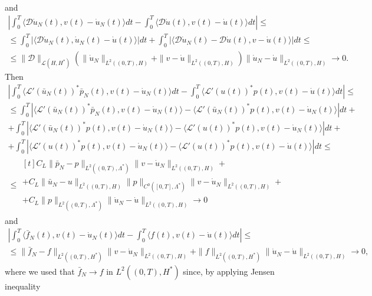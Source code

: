 \documentclass[a4paper,10pt,twoside]{amsbook}
\numberwithin{section}{chapter}
\numberwithin{equation}{chapter}
\theoremstyle{definition}
\begin{document}
and
\[
\begin{multlined}
\left|\int_0^T\langle \mathcal{D}\dot{u}_N(t),v(t)-\dot{u}_N(t)\rangle dt-\int_0^T\langle\mathcal{D}\dot{u}(t),v(t)-\dot{u}(t)\rangle dt\right|\le\\
\le\int_0^T\left|\langle\mathcal{D}\dot{u}_N(t),\dot{u}_N(t)-\dot{u}(t)\rangle\right|dt+\int_0^T\left|\langle\mathcal{D}\dot{u}_N(t)-\mathcal{D}\dot{u}(t),v-\dot{u}(t)\rangle\right|dt\le\\
\le\|\mathcal{D}\|_{\mathscr{L}(H,H^*)}\left(\|\dot{u}_N\|_{L^2((0,T),H)}+\|v-\dot{u}\|_{L^2((0,T),H)}\right)\|\dot{u}_N-\dot{u}\|_{L^2((0,T),H)}\to0.
\end{multlined}
\]
Then
\[
\begin{multlined}
\left|\int_0^T\langle\mathcal{L}'(\bar{u}_N(t))^*\bar{p}_N(t),v(t)-\dot{u}_N(t)\rangle dt-\int_0^T\langle\mathcal{L}'(u(t))^*p(t),v(t)-\dot{u}(t)\rangle dt\right|\le\\
\le\int_0^T\left|\langle\mathcal{L}'(\bar{u}_N(t))^*\bar{p}_N(t),v(t)-\dot{u}_N(t)\rangle-\langle\mathcal{L}'(\bar{u}_N(t))^*p(t),v(t)-\dot{u}_N(t)\rangle\right|dt+\\
+\int_0^T\left|\langle\mathcal{L}'(\bar{u}_N(t))^*p(t),v(t)-\dot{u}_N(t)\rangle-\langle\mathcal{L}'(u(t))^*p(t),v(t)-\dot{u}_N(t)\rangle\right|dt+\\
+\int_0^T\left|\langle\mathcal{L}'(u(t))^*p(t),v(t)-\dot{u}_N(t)\rangle-\langle\mathcal{L}'(u(t))^*p(t),v(t)-\dot{u}(t)\rangle\right|dt\le\\
\le
\begin{multlined}[t]
C_L\|\bar{p}_N-p\|_{L^2((0,T),\Lambda^*)}\|v-\dot{u}_N\|_{L^2((0,T),H)}+\\
+C_L\|\bar{u}_N-u\|_{L^2((0,T),H)}\|p\|_{C^0([0,T],\Lambda^*)}\|v-\dot{u}_N\|_{L^2((0,T),H)}+\\
+C_L\|p\|_{L^2((0,T),\Lambda^*)}\|\dot{u}_N-\dot{u}\|_{L^2((0,T),H)}\to0
\end{multlined}
\end{multlined}
\]
and
\[
\begin{multlined}
\left|\int_0^T\langle\bar{f}_N(t),v(t)-\dot{u}_N(t)\rangle dt-\int_0^T\langle f(t),v(t)-\dot{u}(t)\rangle dt\right|\le\\
\le\|\bar{f}_N-f\|_{L^2((0,T),H^*)}\|v-\dot{u}_N\|_{L^2((0,T),H)}+\|f\|_{L^2((0,T),H^*)}\|\dot{u}_N-\dot{u}\|_{L^2((0,T),H)}\to0,
\end{multlined}
\]
where we used that $\bar f_N\to f$ in $L^2((0,T),H^*)$ since, by applying Jensen inequality
\end{document}

